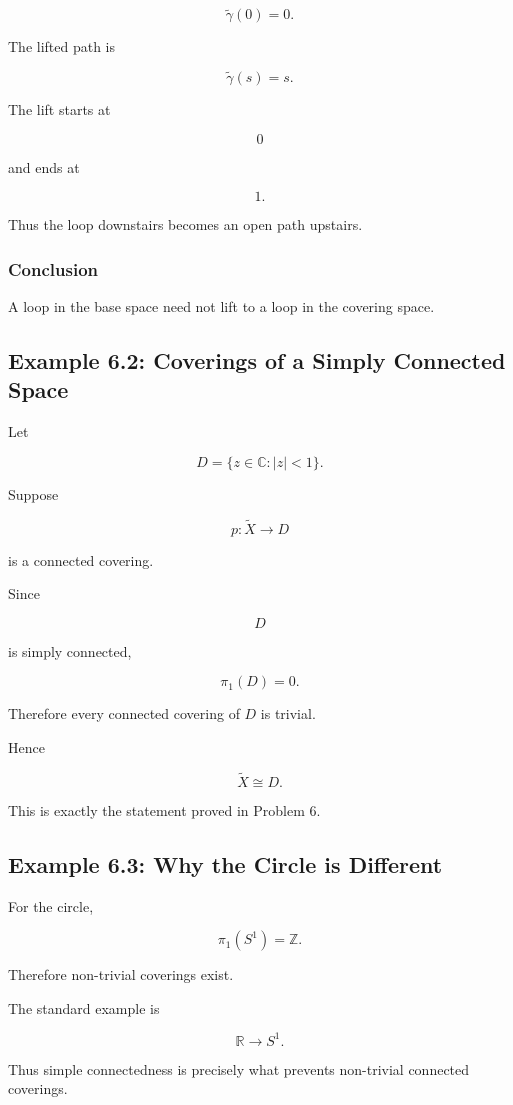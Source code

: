\documentclass[12pt,a4paper]{article}
\theoremstyle{notespace}
\begin{document}
\[
\widetilde{\gamma}(0)=0.
\]

The lifted path is

\[
\widetilde{\gamma}(s)=s.
\]

The lift starts at

\[
0
\]

and ends at

\[
1.
\]

Thus the loop downstairs becomes an open path upstairs.

\subsubsection*{Conclusion}

A loop in the base space need not lift to a loop in the covering space.

\subsection{Example 6.2: Coverings of a Simply Connected Space}

Let

\[
D
=
\{z\in\mathbb C:|z|<1\}.
\]

Suppose

\[
p:\widetilde X\to D
\]

is a connected covering.

Since

\[
D
\]

is simply connected,

\[
\pi_1(D)=0.
\]

Therefore every connected covering of \(D\) is trivial.

Hence

\[
\widetilde X
\cong
D.
\]

This is exactly the statement proved in Problem 6.

\subsection{Example 6.3: Why the Circle is Different}

For the circle,

\[
\pi_1(S^1)
=
\mathbb Z.
\]

Therefore non-trivial coverings exist.

The standard example is

\[
\mathbb R
\longrightarrow
S^1.
\]

Thus simple connectedness is precisely what prevents non-trivial connected coverings.
\end{document}
